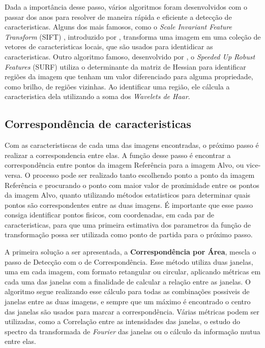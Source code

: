     Dada a importância desse passo, vários algoritmos foram desenvolvidos com o passar dos anos para resolver de maneira
rápida e eficiente a detecção de caracteristicas. Alguns dos mais famosos, como o 
\textit{Scale Invariant Feature Transform} (SIFT) , introduzido por \cite{lowe1999object}, transforma uma imagem em uma 
coleção de vetores de caracteristicas locais, que são usados para identidicar as caracteristicas. Outro algoritmo famoso,
desenvolvido por \cite{bay2006surf}, o \textit{Speeded Up Robust Features} (SURF) utiliza o determinante da matriz de
Hessian para identificar regiões da imagem que tenham um valor diferenciado para alguma propriedade, como brilho, de 
regiões vizinhas. Ao identificar uma região, ele cálcula a caracteristica dela utilizando a soma dos 
\textit{Wavelets de Haar}.

\subsection{Correspondência de caracteristicas}

    Com as caracteristiscas de cada uma das imagens encontradas, o próximo passo é realizar a correspondencia entre elas.
A função desse passo é encontrar a correspondência entre pontos da imagem Referência para a imagem Alvo, ou vice-versa. 
O processo pode ser realizado tanto escolhendo ponto a ponto da imagem Referência e procurando o ponto com maior valor 
de proximidade entre os pontos da imagem Alvo, quanto utilizando métodos estatisticos para determinar quais pontos são 
correspondentes entre as duas imagens. É importante que esse passo consiga identificar pontos fisicos, com coordenadas, 
em cada par de caracteristicas, para que uma primeira estimativa dos parametros da função de transformação possa ser 
utilizada como ponto de partida para o próximo passo.

    A primeira solução a ser apresentada, a \textbf{Correspondência por Área}, mescla o passo de Detecção com o de 
Correspondência. Esse método utiliza duas janelas, uma em cada imagem, com formato retangular ou circular, aplicando
métricas em cada uma das janelas com a finalidade de calcular a relação entre as janelas. O algoritmo segue realizando
esse cálculo para todas as combinações possiveis de janelas entre as duas imagens, e sempre que um máximo é encontrado
o centro das janelas são usados para marcar a correspondência. Várias métricas podem ser utilizadas, como a 
Correlação entre as intensidades das janelas, o estudo do spectro da transformada de \textit{Fourier} das janelas ou 
o cálculo da informação mutua entre elas.

